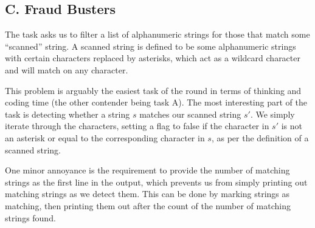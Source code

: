 \subsection*{C. Fraud Busters}

The task asks us to filter a list of alphanumeric strings for those that match
some ``scanned'' string. A scanned string is defined to be some
alphanumeric strings with certain characters replaced by asterisks, which act
as a wildcard character and will match on any character.

This problem is arguably the easiest task of the round in terms of thinking and
coding time (the other contender being task A). The most interesting part of
the task is detecting whether a string $s$ matches our scanned string $s'$. We
simply iterate through the characters, setting a flag to false if the character
in $s'$ is not an asterisk or equal to the corresponding character in $s$, as
per the definition of a scanned string.

One minor annoyance is the requirement to provide the number of matching
strings as the first line in the output, which prevents us from simply printing
out matching strings as we detect them. This can be done by marking strings as
matching, then printing them out after the count of the number of matching
strings found.
